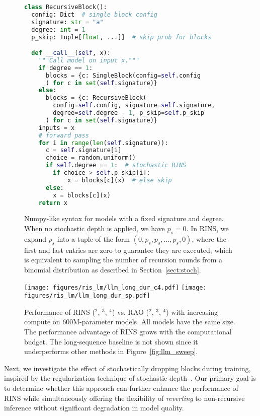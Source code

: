 \begin{figure}
    \centering

\begin{lstlisting}[language=Python, style=mystyle]
class RecursiveBlock():
  config: Dict  # single block config
  signature: str = "a"
  degree: int = 1
  p_skip: Tuple[float, ...]]  # skip prob for blocks

  def __call__(self, x):
    """Call model on input x."""
    if degree == 1:
      blocks = {c: SingleBlock(config=self.config
      ) for c in set(self.signature)}
    else:
      blocks = {c: RecursiveBlock(
        config=self.config, signature=self.signature,
        degree=self.degree - 1, p_skip=self.p_skip
      ) for c in set(self.signature)}
    inputs = x
    # forward pass
    for i in range(len(self.signature)):
      c = self.signature[i]
      choice = random.uniform()
      if self.degree == 1:  # stochastic RINS
        if choice > self.p_skip[i]:
            x = blocks[c](x)  # else skip
      else:
        x = blocks[c](x)
    return x
\end{lstlisting}
    \caption{Numpy-like syntax for models with a fixed signature and degree. When no stochastic depth is applied, we have $p_{s} = 0$. In RINS, we expand $p_{s}$ into a tuple of the form $(0, p_s, p_s, \ldots, p_s, 0)$, where the first and last entries are zero to guarantee they are executed, which is equivalent to sampling the number of recursion rounds from a binomial distribution as described in Section~\ref{sect:stoch}.}
    \label{fig:ris_algorithm}
\end{figure}

\begin{figure}[t]
    \centering
    \texttt{[image: figures/ris\_lm/llm\_long\_dur\_c4.pdf]}
    \texttt{[image: figures/ris\_lm/llm\_long\_dur\_sp.pdf]}
    \caption{
Performance of RINS (\A$^2$\B, \A$^3$\B, \A$^4$\B) vs. RAO (\A$^2$, \A$^3$, \A$^4$) with increasing compute on 600M-parameter models. All models have the same size. The performance advantage of RINS grows with the computational budget. The long-sequence baseline is not shown since it underperforms other methods in Figure~\ref{fig:llm_sweep}.}
    \label{fig:llm_long_dur}
\end{figure}

Next, we investigate the effect of stochastically dropping blocks during training, inspired by the regularization technique of stochastic depth~\cite{huang2016deepnetworksstochasticdepth}. Our primary goal is to determine whether this approach can further enhance the performance of RINS while simultaneously offering the flexibility of \emph{reverting} to non-recursive inference without significant degradation in model quality.

